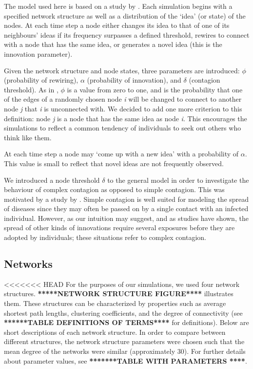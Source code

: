 

The model used here is based on a study by \citet*{HN2006}.  Each simulation begins with a specified network structure as well as a distribution of the `idea' (or state) of the nodes. At each time step a node either changes its idea to that of one of its neighbours' ideas if its frequency surpasses a defined threshold, rewires to connect with a node that has the same idea, or generates a novel idea (this is the innovation parameter). 


Given the network structure and node states, three parameters are introduced: $\phi$ (probability of rewiring), $\alpha$ (probability of innovation), and $\delta$ (contagion threshold). As in \citet*{HN2006}, $\phi$ is a value from zero to one, and is the probability that one of the edges of a randomly chosen node \emph{i} will be changed to connect to another node \emph{j} that \emph{i} is unconnected with. We decided to add one more criterion to this definition: node \emph{j} is a node that has the same idea as node \emph{i}. This encourages the simulations to reflect a common tendency of individuals to seek out others who think like them.


At each time step a node may `come up with a new idea' with a probability of $\alpha$. This value is small to reflect that novel ideas are not frequently observed.


We introduced a node threshold $\delta$ to the general model in order to investigate the behaviour of complex contagion as opposed to simple contagion. This was motivated by a study by \citet*{CM2007}. Simple contagion is well suited for modeling the spread of diseases since they may often be passed on by a single contact with an infected individual. However, as our intuition may suggest, and as studies have shown, the spread of other kinds of innovations require several exposures before they are adopted by individuals; these situations refer to complex contagion.


\subsection{Networks}

<<<<<<< HEAD
For the purposes of our simulations, we used four network structures. \textbf{*****NETWORK STRUCTURE FIGURE****} illustrates them. These structures can be characterized by properties such as average shortest path lengths, clustering coefficients, and the degree of connectivity (see \textbf{******TABLE DEFINITIONS OF TERMS****} for definitions). Below are short descriptions of each network structure. In order to compare between different structures, the network structure parameters were chosen such that the mean degree of the networks were similar (approximately 30). For further details about parameter values, see \textbf{*******TABLE WITH PARAMETERS ****}.

